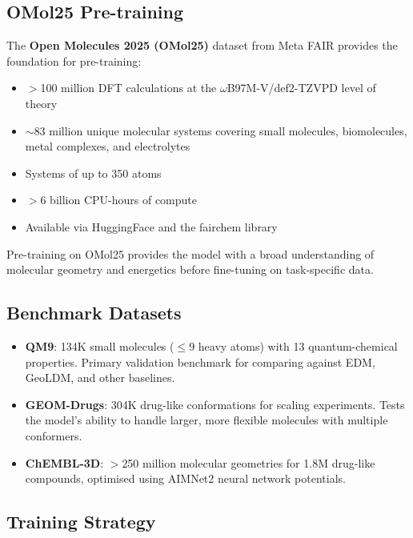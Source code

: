 \documentclass[11pt,a4paper]{article}
\begin{document}
\subsection{OMol25 Pre-training}

The \textbf{Open Molecules 2025 (OMol25)} dataset from Meta FAIR provides
the foundation for pre-training:

\begin{itemize}[leftmargin=2em]
  \item $>$100 million DFT calculations at the $\omega$B97M-V/def2-TZVPD
    level of theory
  \item $\sim$83 million unique molecular systems covering small molecules,
    biomolecules, metal complexes, and electrolytes
  \item Systems of up to 350 atoms
  \item $>$6 billion CPU-hours of compute
  \item Available via HuggingFace and the fairchem library
\end{itemize}

Pre-training on OMol25 provides the model with a broad understanding of
molecular geometry and energetics before fine-tuning on task-specific data.

\subsection{Benchmark Datasets}

\begin{itemize}[leftmargin=2em]
  \item \textbf{QM9}: 134K small molecules ($\leq$9 heavy atoms) with
    13 quantum-chemical properties. Primary validation benchmark for
    comparing against EDM, GeoLDM, and other baselines.
  \item \textbf{GEOM-Drugs}: 304K drug-like conformations for scaling
    experiments. Tests the model's ability to handle larger, more flexible
    molecules with multiple conformers.
  \item \textbf{ChEMBL-3D}: $>$250 million molecular geometries for 1.8M
    drug-like compounds, optimised using AIMNet2 neural network potentials.
\end{itemize}

\subsection{Training Strategy}
\end{document}

